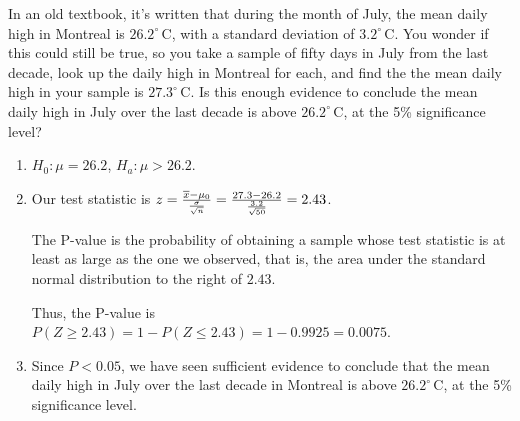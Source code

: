 \begin{example}
In an old textbook, it's written that during the month of July, the mean daily high in Montreal is $26.2^{\circ}$\,C, with a standard deviation of $3.2^{\circ}$\,C. You wonder if this could still be true, so you take a sample of fifty days in July from the last decade, look up the daily high in Montreal for each, and find the the mean daily high in your sample is $27.3^{\circ}$\,C. Is this enough evidence to conclude the mean daily high in July over the last decade is above $26.2^{\circ}$\,C, at the 5\% significance level?

\begin{enumerate}[label=\textnormal{\Roman*}.]
\item $H_0: \mu = 26.2$, $H_a: \mu > 26.2$.

\item Our test statistic is $z = \frac{{\overline{x}} - \mu_{0}}{\frac{\sigma}{\sqrt{n}}} = \frac{27.3 - 26.2}{\frac{3.2}{\sqrt{50}}} = 2.43$.

The P-value is the probability of obtaining a sample whose test statistic is at least as large as the one we observed, that is, the area under the standard normal distribution to the right of $2.43$.
\begin{center}
\end{center}
Thus, the P-value is $P(Z \geq 2.43) = 1 - P(Z \leq 2.43) = 1 - 0.9925 = 0.0075$.

\item Since $P < 0.05$, we have seen sufficient evidence to conclude that the mean daily high in July over the last decade in Montreal is above $26.2^{\circ}$\,C, at the 5\% significance level.
\end{enumerate}
\end{example}

